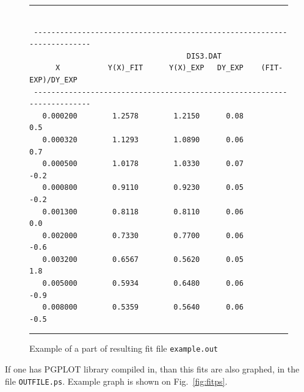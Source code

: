 \documentclass[12pt]{article}
\begin{document}
\begin{figure}
\begin{center}
\hrule
\small
\begin{verbatim}

 ------------------------------------------------------------------------
                                    DIS3.DAT                         
      X           Y(X)_FIT      Y(X)_EXP   DY_EXP    (FIT-EXP)/DY_EXP 
 ------------------------------------------------------------------------ 
   0.000200        1.2578        1.2150      0.08         0.5
   0.000320        1.1293        1.0890      0.06         0.7
   0.000500        1.0178        1.0330      0.07        -0.2
   0.000800        0.9110        0.9230      0.05        -0.2
   0.001300        0.8118        0.8110      0.06         0.0
   0.002000        0.7330        0.7700      0.06        -0.6
   0.003200        0.6567        0.5620      0.05         1.8
   0.005000        0.5934        0.6480      0.06        -0.9
   0.008000        0.5359        0.5640      0.06        -0.5 

\end{verbatim}
\hrule
\end{center}
\caption{Example of a part of resulting fit file \texttt{example.out}}
\label{fig:fitout}
\end{figure}

If one has PGPLOT library compiled in, than this fits are also graphed,
in the file \texttt{OUTFILE.ps}. Example graph is shown on Fig.~\ref{fig:fitps}.
\end{document}
